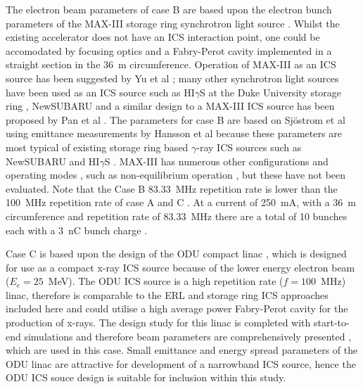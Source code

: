 \documentclass[../main.tex]{subfiles}
\begin{document}
The electron beam parameters of case B are based upon the electron bunch parameters of the MAX-III storage ring synchrotron light source \cite{sjostrom2009max,hansson2011imaging,rosborg2012electron}. Whilst the existing accelerator does not have an ICS interaction point, one could be accomodated by focusing optics and a Fabry-Perot cavity implemented in a straight section in the 36~\si{\metre} circumference. Operation of MAX-III as an ICS source has been suggested by Yu et al \cite{yu2009lattice,owen2013nonequilibrium}; many other synchrotron light sources have been used as an ICS source such as HI$\gamma$S at the Duke University storage ring \cite{weller2009research}, NewSUBARU \cite{utsunomiya2015gamma} and a similar design to a MAX-III ICS source has been proposed by Pan et al \cite{pan2019design}. The parameters for case B are based on Sj\"{o}strom et al \cite{sjostrom2009max} using emittance measurements by Hansson et al \cite{hansson2011imaging} because these parameters are most typical of existing storage ring based $\gamma$-ray ICS sources such as NewSUBARU \cite{utsunomiya2015gamma} and HI$\gamma$S \cite{weller2009research}.  MAX-III has numerous other configurations and operating modes \cite{sjostrom2009max}, such as non-equilibrium operation \cite{owen2012modular}, but these have not been evaluated. Note that the Case B 83.33~\si{\mega\hertz} repetition rate is lower than the 100~\si{\mega\hertz} repetition rate of case A and C \cite{sjostrom2009max,rosborg2012electron}. At a current of 250~\si{\milli\ampere}, with a 36~\si{\meter} circumference and repetition rate of 83.33~\si{\mega\hertz} \cite{sjostrom2009max,rosborg2012electron} there are a total of 10 bunches each with a 3~\si{\nano\coulomb} bunch charge .

Case C is based upon the design of the ODU compact linac \cite{krafft2016laser,deitrick2017inverse,deitrick2018high}, which is designed for use as a compact x-ray ICS source because of the lower energy electron beam ($E_{e} = 25$~\si{\mega\electronvolt}). The ODU ICS source is a high repetition rate ($f = 100$~\si{\mega\hertz}) linac, therefore is comparable to the ERL and storage ring ICS approaches included here and could utilise a high average power Fabry-Perot cavity for the production of x-rays. The design study for this linac is completed with start-to-end simulations and therefore beam parameters are comprehensively presented \cite{deitrick2017inverse,deitrick2018high}, which are used in this case. Small emittance and energy spread parameters of the ODU linac are attractive for development of a narrowband ICS source, hence the ODU ICS souce design is suitable for inclusion within this study.  
\end{document}
